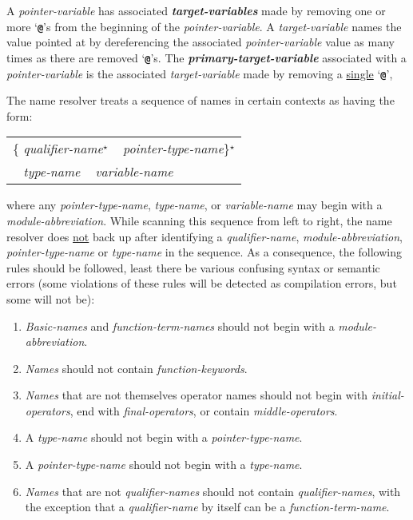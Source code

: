 \documentclass[12pt]{article}
\newcommand{\TT}[1]{{\tt \bfseries #1}}
\newcommand{\STAR}{{\Large $^\star$}}
\newcommand{\emkey}[1]{{\em \bfseries #1}}
\begin{document}
A {\em pointer-variable} has associated \emkey{target-variables}
made by removing one or more `\TT{@}'s from the beginning of the
{\em pointer-variable}.  A {\em target-variable}
names the value pointed at by dereferencing the associated
{\em pointer-variable}
value as many times as there are removed `\TT{@}'s.  The
\emkey{primary-target-variable} associated with a {\em pointer-variable}
is the associated {\em target-variable} made by removing
a \underline{single} `\TT{@}',

The name resolver treats a sequence of
names in certain contexts as having the form:
\begin{center}
\begin{tabular}{l}
\{ {\em qualifier-name}\STAR{} ~ {\em pointer-type-name}\}\STAR{} \\
\hspace*{0.5in}{\em qualifier-name}\STAR{} ~
{\em type-name} ~ {\em variable-name}
\end{tabular}
\end{center}
where any {\em pointer-type-name}, {\em type-name}, or {\em variable-name}
may begin with a {\em module-abbre\-via\-tion}.
While scanning this sequence from left to right,
the name resolver does \underline{not} back up after identifying
a {\em qualifier-name}, {\em module-abbreviation}, {\em pointer-type-name}
or {\em type-name} in the sequence.  As a consequence, the
following rules should be followed, least there be
various confusing syntax or semantic errors (some
violations of these rules will be detected as compilation errors,
but some will not be):
\begin{enumerate}
\item\label{MODULE-ABBREVIATION-RULE}
{\em Basic-names} and {\em function-term-names}
should not begin with a {\em module-abbre\-viation}.
\item\label{FUNCTION-KEYWORD-RULE}
{\em Names} should not contain {\em function-keywords}.
\item\label{OPERATOR-RULE}
{\em Names} that are not themselves operator names should not
begin with {\em initial-operators},
end with {\em final-operators}, or contain {\em middle-operators}.
\item\label{TYPE-NAME-RULE}
A {\em type-name} should not begin with a {\em pointer-type-name}.
\item\label{POINTER-TYPE-NAME-RULE}
A {\em pointer-type-name} should not begin with a {\em type-name}.
\item\label{QUALIFIER-RULE}
{\em Names} that are not {\em qualifier-names}
should not contain {\em qualifier-names}, with the
exception that a {\em qualifier-name} by itself can be
a {\em function-term-name}.
\end{enumerate}
\end{document}
